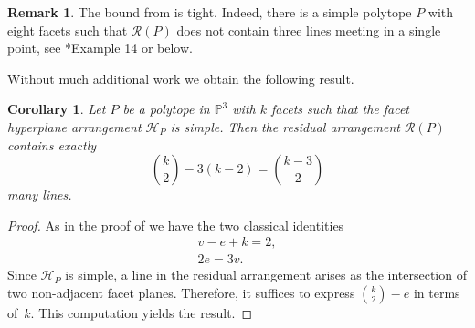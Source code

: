 \documentclass[a4paper,10pt]{amsart}
\theoremstyle{definition}
\newtheorem{rem}[Def]{Remark}
\theoremstyle{plain}
\newtheorem{cor}[Def]{Corollary}
\newcommand{\cR}{{\mathcal R}}
\newcommand{\pp}{\mathbb{P}}
\begin{document}
\begin{rem}
    The  bound from  is tight. Indeed, there is a simple polytope $P$ with eight facets such that $\cR(P)$ does not contain three lines meeting in a single point, see \cite{KohnRanestad2019AdjCurves}*{Example 14} or  below.
\end{rem}
Without much additional work we obtain the following result.

\begin{cor} \label{cor:ResLines}
 Let $P$ be a polytope in $\pp^3$ with $k$ facets such that the facet hyperplane arrangement $\mathcal{H}_P$ is simple. Then the residual arrangement $\cR(P)$ contains exactly
 \begin{equation*}
    \binom{k}{2} - 3(k-2) = \binom{k-3}{2}
 \end{equation*}
 many lines.
\end{cor}

\begin{proof}
 As in the proof of  we have the two classical identities
 \begin{equation*}
 \begin{split}
    v - e + k = 2, \\
    2e = 3v.
 \end{split}
 \end{equation*}
 Since $\mathcal{H}_P$ is simple, a line in the residual arrangement arises as the intersection of two non-adjacent facet planes. Therefore, it suffices to express $\binom{k}{2} - e$ in terms of~$k$. This computation yields the result.
\end{proof}
\end{document}

